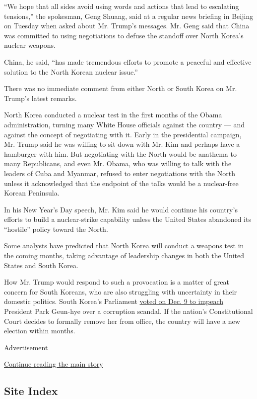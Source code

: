 ``We hope that all sides avoid using words and actions that lead to
escalating tensions,'' the spokesman, Geng Shuang, said at a regular
news briefing in Beijing on Tuesday when asked about Mr. Trump's
messages. Mr. Geng said that China was committed to using negotiations
to defuse the standoff over North Korea's nuclear weapons.

China, he said, ``has made tremendous efforts to promote a peaceful and
effective solution to the North Korean nuclear issue.''

There was no immediate comment from either North or South Korea on Mr.
Trump's latest remarks.

North Korea conducted a nuclear test in the first months of the Obama
administration, turning many White House officials against the country
--- and against the concept of negotiating with it. Early in the
presidential campaign, Mr. Trump said he was willing to sit down with
Mr. Kim and perhaps have a hamburger with him. But negotiating with the
North would be anathema to many Republicans, and even Mr. Obama, who was
willing to talk with the leaders of Cuba and Myanmar, refused to enter
negotiations with the North unless it acknowledged that the endpoint of
the talks would be a nuclear-free Korean Peninsula.

In his New Year's Day speech, Mr. Kim said he would continue his
country's efforts to build a nuclear-strike capability unless the United
States abandoned its ``hostile'' policy toward the North.

Some analysts have predicted that North Korea will conduct a weapons
test in the coming months, taking advantage of leadership changes in
both the United States and South Korea.

How Mr. Trump would respond to such a provocation is a matter of great
concern for South Koreans, who are also struggling with uncertainty in
their domestic politics. South Korea's Parliament
\href{https://www.nytimes.com/2016/12/09/world/asia/south-korea-president-park-geun-hye-impeached.html}{voted
on Dec. 9 to impeach} President Park Geun-hye over a corruption scandal.
If the nation's Constitutional Court decides to formally remove her from
office, the country will have a new election within months.

Advertisement

\protect\hyperlink{after-bottom}{Continue reading the main story}

\hypertarget{site-index}{%
\subsection{Site Index}\label{site-index}}

